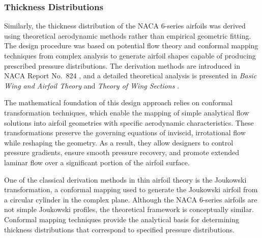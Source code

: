 
\subsubsection*{Thickness Distributions}

Similarly, the thickness distribution of the NACA 6-series airfoils was derived using theoretical aerodynamic methods rather than empirical geometric fitting. 
The design procedure was based on potential flow theory and conformal mapping techniques from complex analysis to generate airfoil shapes capable of producing prescribed pressure distributions. 
The derivation methods are introduced in NACA Report No.~824 \cite{NACA_TR_824}, and a detailed theoretical analysis is presented in \textit{Basic Wing and Airfoil Theory} \cite{basic_wing_and_airfoil_theory} and \textit{Theory of Wing Sections} \cite{theory_of_wing_sections}.

The mathematical foundation of this design approach relies on conformal transformation techniques, which enable the mapping of simple analytical flow solutions into airfoil geometries with specific aerodynamic characteristics. 
These transformations preserve the governing equations of inviscid, irrotational flow while reshaping the geometry. 
As a result, they allow designers to control pressure gradients, ensure smooth pressure recovery, and promote extended laminar flow over a significant portion of the airfoil surface.

One of the classical derivation methods in thin airfoil theory is the Joukowski transformation, a conformal mapping used to generate the Joukowski airfoil from a circular cylinder in the complex plane. 
Although the NACA 6-series airfoils are not simple Joukowski profiles, the theoretical framework is conceptually similar. 
Conformal mapping techniques provide the analytical basis for determining thickness distributions that correspond to specified pressure distributions.